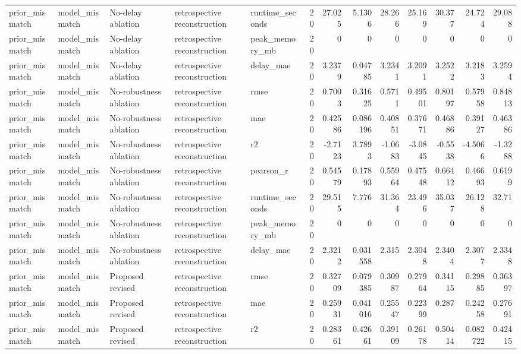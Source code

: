 \begin{table}[!htbp]
{{\begin{tabular}{lllllrrrrrrrr}
prior_mismatch & model_mismatch & No-delay ablation & retrospective reconstruction & runtime_seconds & 20 & 27.025 & 5.1306 & 28.266 & 25.169 & 30.377 & 24.724 & 29.088 \\
prior_mismatch & model_mismatch & No-delay ablation & retrospective reconstruction & peak_memory_mb & 20 & 0 & 0 & 0 & 0 & 0 & 0 & 0 \\
prior_mismatch & model_mismatch & No-delay ablation & retrospective reconstruction & delay_mae & 20 & 3.2379 & 0.04785 & 3.2341 & 3.2091 & 3.2522 & 3.2183 & 3.2594 \\
prior_mismatch & model_mismatch & No-robustness ablation & retrospective reconstruction & rmse & 20 & 0.7003 & 0.31625 & 0.5711 & 0.49501 & 0.80197 & 0.57958 & 0.84813 \\
prior_mismatch & model_mismatch & No-robustness ablation & retrospective reconstruction & mae & 20 & 0.42586 & 0.086196 & 0.40851 & 0.37671 & 0.46886 & 0.39127 & 0.46386 \\
prior_mismatch & model_mismatch & No-robustness ablation & retrospective reconstruction & r2 & 20 & -2.7123 & 3.7893 & -1.0683 & -3.0845 & -0.5538 & -4.5066 & -1.3288 \\
prior_mismatch & model_mismatch & No-robustness ablation & retrospective reconstruction & pearson_r & 20 & 0.54579 & 0.17893 & 0.55964 & 0.47548 & 0.66412 & 0.46693 & 0.6199 \\
prior_mismatch & model_mismatch & No-robustness ablation & retrospective reconstruction & runtime_seconds & 20 & 29.515 & 7.776 & 31.364 & 23.496 & 35.037 & 26.128 & 32.71 \\
prior_mismatch & model_mismatch & No-robustness ablation & retrospective reconstruction & peak_memory_mb & 20 & 0 & 0 & 0 & 0 & 0 & 0 & 0 \\
prior_mismatch & model_mismatch & No-robustness ablation & retrospective reconstruction & delay_mae & 20 & 2.3212 & 0.031558 & 2.315 & 2.3048 & 2.3404 & 2.3077 & 2.3348 \\
prior_mismatch & model_mismatch & Proposed revised & retrospective reconstruction & rmse & 20 & 0.32709 & 0.079385 & 0.30987 & 0.27964 & 0.34115 & 0.29885 & 0.36397 \\
prior_mismatch & model_mismatch & Proposed revised & retrospective reconstruction & mae & 20 & 0.25931 & 0.041016 & 0.25547 & 0.22399 & 0.287 & 0.24258 & 0.27691 \\
prior_mismatch & model_mismatch & Proposed revised & retrospective reconstruction & r2 & 20 & 0.28361 & 0.42661 & 0.39109 & 0.26178 & 0.50414 & 0.082722 & 0.42415 \\

\end{tabular}}}
\end{table}
